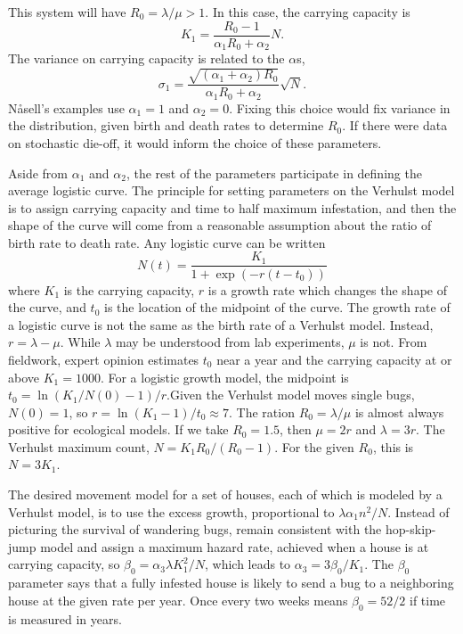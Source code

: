\documentclass{article}
\begin{document}
This system will have $R_0=\lambda/\mu>1$. In this
case, the carrying capacity is
\begin{equation}
  K_1=\frac{R_0-1}{\alpha_1 R_0+\alpha_2}N.
\end{equation}
The variance on carrying capacity is related to the $\alpha$s,
\begin{equation}
  \sigma_1=\frac{\sqrt{(\alpha_1+\alpha_2)R_0}}{\alpha_1R_0+\alpha_2}\sqrt{N}.
\end{equation}
N{\aa}sell's examples use $\alpha_1=1$ and $\alpha_2=0$. 
Fixing this choice would fix variance in the distribution, given birth
and death rates to determine $R_0$. If there were data on stochastic die-off,
it would inform the choice of these parameters.

Aside from $\alpha_1$ and $\alpha_2$, the rest of the parameters
participate in defining the average logistic curve.
The principle for setting parameters on the Verhulst model
is to assign carrying capacity and time to half maximum infestation,
and then the shape of the curve will come from a reasonable
assumption about the ratio of birth rate to death rate.
Any logistic curve can be written
\begin{equation}
  N(t)=\frac{K_1}{1+\exp\left(-r(t-t_0)\right)}
\end{equation}
where $K_1$ is the carrying capacity, $r$ is a growth rate
which changes the shape of the curve, and $t_0$ is the location
of the midpoint of the curve. The growth rate of a logistic
curve is not the same as the birth rate of a Verhulst model.
Instead, $r=\lambda-\mu$. While $\lambda$ may be understood from lab
experiments, $\mu$ is not. From fieldwork, expert opinion estimates
$t_0$ near a year and the carrying capacity at or above $K_1=1000.$
For a logistic growth model,
the midpoint is $t_0=\ln(K_1/N(0)-1)/r$.Given the Verhulst model
moves single bugs, $N(0)=1$, so $r=\ln(K_1-1)/t_0\approx 7$.
The ration $R_0=\lambda/\mu$ is almost always positive for
ecological models. If we take $R_0=1.5$, then $\mu=2r$ and $\lambda=3r$.
The Verhulst maximum count, $N=K_1R_0/(R_0-1)$. For the given $R_0$,
this is $N=3K_1$.


The desired movement model for a set of houses, each of which
is modeled by a Verhulst model, is to use the excess growth,
proportional to $\lambda \alpha_1 n^2/N$. Instead of picturing
the survival of wandering bugs, remain consistent with the
hop-skip-jump model and assign a maximum hazard rate,
achieved when a house is at carrying capacity, so
$\beta_0=\alpha_3\lambda K_1^2/N$, which leads to
$\alpha_3=3\beta_0/K_1$. The $\beta_0$ parameter says
that a fully infested house is likely to send a bug
to a neighboring house at the given rate per year.
Once every two weeks means $\beta_0=52/2$ if time is measured
in years.
\end{document}
